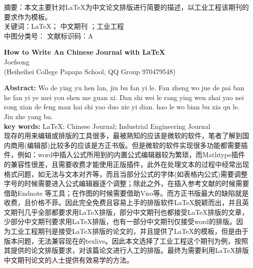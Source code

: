 \noindent \heiti 摘要：\songti 本文主要针对\LaTeX 为中文论文排版进行简要的描述，以工业工程该期刊的要求作为模板。 \\
\heiti 关键词：\songti \LaTeX ； 中文期刊 ；工业工程 \\
\heiti 中图分类号： \hspace{3cm}     \heiti 文献标识码：\songti A \\

\begin{center}
	\textbf{ How to Write An Chinese Journal with \LaTeX} \\ 
	 Joefsong \\ 
	 (Heiheihei College Papapa School, QQ Group 970479548) \\
\end{center}

\noindent \textbf{Abstract:} Wo de ying yu hen lan, jiu bu fan yi le. Fan zheng wo jue de pai ban he fan yi ye mei you shen me guan xi. Dan shi wei le rang ying wen zhai yao nei rong xian de feng man hai shi yao duo xie yi dian. hao le wo bian bu xia qu le. Jiu zhe yang ba.\\
\textbf{key words:}  \LaTeX ; Chinese Journal; Industrial Engineering Journal \\

现存的用来编辑或排版的工具很多，最被熟知的应该是微软的软件，笔者了解到国内商用(编辑部)比较多的应该是方正书版。但是微软的软件实现很多功能都需要插件，例如：word中插入公式所用到的内置公式编辑器较为繁琐，而Mathtype插件的兼容性很差，且需要收费才能使用正版插件，此外在处理文本的过程中经常出现格式问题，如无法与文本对齐等，而且当部分公式的字体(如表格内公式)需要调整字号的时候需要进入公式编辑器逐个调整；除此之外，在插入参考文献的时候需要借助Endnote 等工具；在作图的时候需要借助Viso等。而方正书版最大的缺陷就是收费，且价格不菲。因此完全免费且容易上手的排版软件\LaTeX 脱颖而出，并且英文期刊几乎全部都要求用\LaTeX 排版，部分中文期刊也都接受\LaTeX 排版的文章，少部分中文期刊要求用\LaTeX 排版，也有一部分中文期刊仅接受word的排版。因为工业工程期刊是接受\LaTeX 排版的论文的，并且提供了\LaTeX 的模板，但是由于版本问题，无法兼容现在的texlive。因此本文选择了工业工程这个期刊为例，按照其提供的论文排版要求，对该篇论文进行人工的排版。最终为需要利用\LaTeX 排版中文期刊论文的人士提供有效易学的方法。